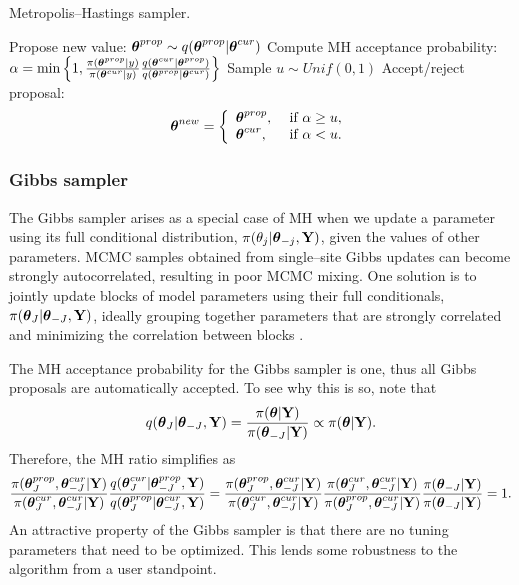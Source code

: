 \begin{algorithm}[htbp]
	\caption{Metropolis--Hastings sampler.}
	\label{alg:metropolis_hastings}
	\begin{algorithmic}[1]
		\State Propose new value: $ \boldsymbol{\theta}^{prop} \sim q(\boldsymbol{\theta}^{prop}|\boldsymbol{\theta}^{cur}) $
		\State Compute MH acceptance probability: $ \alpha = \min\left \lbrace 1, \frac{\pi(\boldsymbol{\theta}^{prop}|y)}{\pi(\boldsymbol{\theta}^{cur}|y)}\frac{q(\boldsymbol{\theta}^{cur}|\boldsymbol{\theta}^{prop})}{q(\boldsymbol{\theta}^{prop}|\boldsymbol{\theta}^{cur})}\right \rbrace $
		\State Sample $ u\sim Unif(0,1) $
		\State Accept/reject proposal: \vspace{-0.1in}
			\begin{equation*}
			\boldsymbol{\theta}^{new} = \left\lbrace \begin{array}{ll}
			\boldsymbol{\theta}^{prop},&\ \text{if}\ \alpha \geq u,\\
			\boldsymbol{\theta}^{cur},&\ \text{if}\ \alpha < u.
			\end{array} \right.
			\end{equation*}
		\EndProcedure
	\end{algorithmic}
\end{algorithm}

\subsubsection{Gibbs sampler}
\label{subsubsec:gibbs}

The Gibbs sampler \cite{geman1984stochastic} arises as a special case of MH when we update a parameter using its full conditional distribution, $ \pi(\theta_j|\boldsymbol{\theta}_{-j},\mathbf{Y}) $, given the values of other parameters. MCMC samples obtained from single--site Gibbs updates can become strongly autocorrelated, resulting in poor MCMC mixing. One solution is to jointly update blocks of model parameters using their full conditionals, $ \pi(\boldsymbol{\theta}_{J}|\boldsymbol{\theta}_{-J},\mathbf{Y}) $, ideally grouping together parameters that are strongly correlated and minimizing the correlation between blocks \cite{knorr2002block,roberts1997updating,rue2005gaussian}.

The MH acceptance probability for the Gibbs sampler is one, thus all Gibbs proposals are automatically accepted. To see why this is so, note that $$q(\boldsymbol{\theta}_{J}|\boldsymbol{\theta}_{-J},\mathbf{Y}) = \frac{\pi(\boldsymbol{\theta}|\mathbf{Y})}{\pi(\boldsymbol{\theta}_{-J}|\mathbf{Y})} \propto\pi(\boldsymbol{\theta}|\mathbf{Y}).$$
Therefore, the MH ratio simplifies as
\begin{align*}
\frac{\pi(\boldsymbol{\theta}_J^{prop},\boldsymbol{\theta}_{-J}^{cur}|\mathbf{Y})}{\pi(\boldsymbol{\theta}_J^{cur},\boldsymbol{\theta}_{-J}^{cur}|\mathbf{Y})}\frac{q(\boldsymbol{\theta}_J^{cur}|\boldsymbol{\theta}_{-J}^{prop},\mathbf{Y})}{q(\boldsymbol{\theta}_J^{prop}|\boldsymbol{\theta}_{-J}^{cur},\mathbf{Y})} &= \frac{\pi(\boldsymbol{\theta}_J^{prop},\boldsymbol{\theta}_{-J}^{cur}|\mathbf{Y})}{\pi(\boldsymbol{\theta}_J^{cur},\boldsymbol{\theta}_{-J}^{cur}|\mathbf{Y})}\frac{\pi(\boldsymbol{\theta}_J^{cur},\boldsymbol{\theta}_{-J}^{cur}|\mathbf{Y})}{\pi(\boldsymbol{\theta}_J^{prop},\boldsymbol{\theta}_{-J}^{cur}|\mathbf{Y})}\frac{\pi(\boldsymbol{\theta}_{-J}|\mathbf{Y})}{\pi(\boldsymbol{\theta}_{-J}|\mathbf{Y})} = 1. \\
\end{align*}
An attractive property of the Gibbs sampler is that there are no tuning parameters that need to be optimized. This lends some robustness to the algorithm from a user standpoint.  

